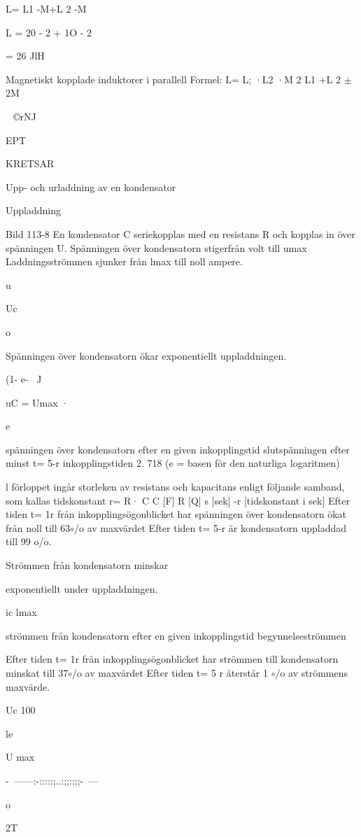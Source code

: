 \documentclass[a4paper,twoside,twocolumn,openright]{book}
\begin{document}
{{{{L= L1 -M+L 2 -M

L = 20 - 2 + 1O - 2

= 26 JlH

Magnetiskt kopplade induktorer i parallell
Formel:
L= L; ·L2 ·M 2
L1 +L 2 $\pm$2M

~©rNJ

EPT

KRETSAR

Upp- och urladdning av en kondensator

Uppladdning

Bild 113-8
En kondensator C seriekopplas med en resistans R och kopplas in över spänningen U.
Spänningen över kondensatorn stigerfrån
volt till umax
Laddningsströmmen sjunker från lmax till
noll ampere.

u

Uc

o

Spänningen över kondensatorn ökar
exponentiellt uppladdningen.

(1- e-~ J

uC = Umax ·

e

spänningen över kondensatorn efter
en given inkopplingstid
slutspänningen efter minst t= 5-r
inkopplingstiden
2. 718 (e = basen för den naturliga
logaritmen)

l förloppet ingår storleken av resistans
och kapacitans enligt följande samband, som
kallas tidskonstant
r= R· C
C [F] R [Q] s [sek] -r [tidskonstant i sek]
Efter tiden t= 1r från inkopplingsögonblicket har spänningen över kondensatorn
ökat från noll till 63$\circ$/o av maxvärdet
Efter tiden t= 5-r är kondensatorn uppladdad till 99 o/o.

Strömmen från kondensatorn minskar

exponentiellt under uppladdningen.

ic
lmax

strömmen från kondensatorn efter en
given inkopplingstid
begynnelseströmmen

Efter tiden t= 1r från inkopplingsögonblicket har strömmen till kondensatorn
minskat till 37$\circ$/o av maxvärdet
Efter tiden t= 5 r återstår 1 $\circ$/o av strömmens maxvärde.

Uc
100%

le

U max

-~------:-:::::;..:;;:;;;-~---

o

2T

}}}}
\end{document}
